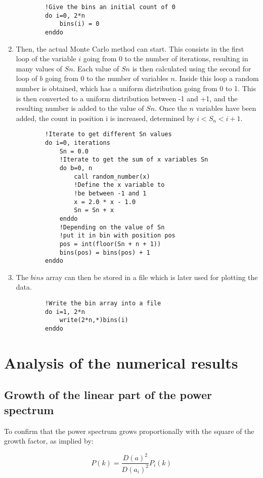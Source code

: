 \documentclass[12pt]{article}
\begin{document}
\begin{enumerate}
\begin{lstlisting}
		!Give the bins an initial count of 0
		do i=0, 2*n
			bins(i) = 0
		enddo
	\end{lstlisting}
	\item Then, the actual Monte Carlo method can start. This consists in the first loop of the variable $i$ going from 0 to the number of iterations, resulting in many values of $Sn$. Each value of $Sn$ is then calculated using the second for loop of $b$ going from 0 to the number of variables $n$. Inside this loop a random number is obtained, which has a uniform distribution going from 0 to 1. This is then converted to a uniform distribution between -1 and +1, and the resulting number is added to the value of $Sn$. Once the $n$ variables have been added, the count in position i is increased, determined by $i < S_{n} < i+1$. 
	\begin{lstlisting}
		!Iterate to get different Sn values
		do i=0, iterations
			Sn = 0.0
			!Iterate to get the sum of x variables Sn
			do b=0, n
				call random_number(x)
				!Define the x variable to 
				!be between -1 and 1
				x = 2.0 * x - 1.0
				Sn = Sn + x
			enddo
			!Depending on the value of Sn 
			!put it in bin with position pos
			pos = int(floor(Sn + n + 1))
			bins(pos) = bins(pos) + 1
		enddo
	\end{lstlisting}
	\item The $bins$ array can then be stored in a file which is later used for plotting the data. 
	\begin{lstlisting}
		!Write the bin array into a file
		do i=1, 2*n
			write(2*n,*)bins(i)
		enddo
	\end{lstlisting}
\end{enumerate}


\section*{Analysis of the numerical results}

\subsection*{Growth of the linear part of the power spectrum}
To confirm that the power spectrum grows proportionally with the square of the growth factor, as implied by:

\begin{equation}
P(k) = \frac{ D(a)^{2}}{ D(a_{i})^{2}} P_{i}(k)
\end{equation}
\end{document}
